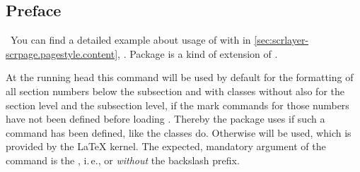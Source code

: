 \begin{Example}
\begin{lstcode}
  \tableofcontents
  \chapter*{Preface}
  \markboth{}{}
  \blindtext[20]
  \blinddocument
  
\end{lstcode}
\end{Example}
\else %
  \ You can find a detailed example about usage of  with
   in
  \autoref{sec:scrlayer-scrpage.pagestyle.content},
  . Package
   is a kind of extension of .%
\fi %
%
%
%
%

\fi %
\fi %


\ifshortversion\IgnoreThisfalse{}\fi
\ifIgnoreThis %
\else %
\ifCommonscrlayerscrpage\else %
\begin{Declaration}
\end{Declaration}
%
At the running head this command will be used by default for the formatting of
all section numbers below the subsection and with classes without
 also for the section level and the subsection level, if the
mark commands for those numbers have not been defined before loading
. Thereby the package uses  if such
a command has been defined, like the \KOMAScript{} classes do. Otherwise
 will be used, which is provided by the \LaTeX{}
kernel. The expected, mandatory argument of the command is the , i.\,e.,  or 
\emph{without} the backslash prefix.

